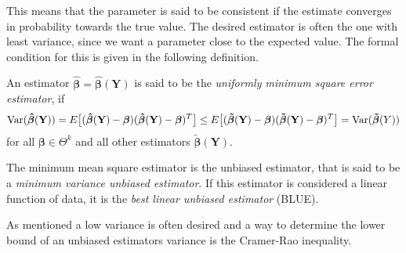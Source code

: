 This means that the parameter is said to be consistent if the estimate converges in probability towards the true value. 
The desired estimator is often the one with least variance, since we want a parameter close to the expected value. The formal condition for this is given in the following definition.

\begin{definition} 
\label{def:minimum_mean_square_error}
An estimator $\boldsymbol{\hat{\beta}}=\boldsymbol{\hat{\beta}}(\textbf{Y})$ is said to be the \textit{uniformly minimum square error estimator}, if
\begin{align*}
    \operatorname{\text{Var}}(\boldsymbol{\hat{\beta}}(\textbf{Y})) = E\big[ (\boldsymbol{\hat{\beta}}(\textbf{Y})-\boldsymbol{\beta})(\boldsymbol{\hat{\beta}}(\textbf{Y})-\boldsymbol{\beta})^T \big] \leq E\big[ (\boldsymbol{\tilde{\beta}}(\textbf{Y})-\boldsymbol{\beta})(\boldsymbol{\tilde{\beta}}(\textbf{Y})-\boldsymbol{\beta})^T \big] = \operatorname{\text{Var}}(\boldsymbol{\tilde{\beta}}(Y))
\end{align*} 
for all $\boldsymbol{\beta} \in \Theta^k $ and all other estimators $\boldsymbol{\tilde{\beta}(\textbf{Y})}$.
 \end{definition}
 
The minimum mean square estimator is the unbiased estimator, that is said to be a \textit{minimum variance unbiased estimator}. If this estimator is considered a linear function of data, it is the \textit{best linear unbiased estimator} (BLUE). 

As mentioned a low variance is often desired and a way to determine the lower bound of an unbiased estimators variance is the Cramer-Rao inequality.
 
